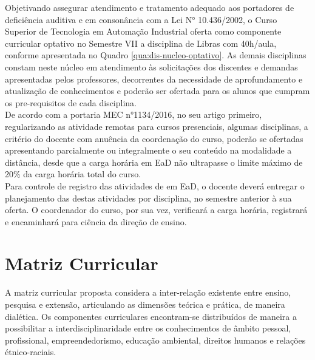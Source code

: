 Objetivando assegurar atendimento e tratamento adequado aos portadores de deficiência auditiva e em consonância com a Lei N° 10.436/2002, o Curso Superior de Tecnologia em Automação Industrial oferta como componente curricular optativo no Semestre VII a disciplina de Libras com 40h/aula, conforme apresentada no Quadro \ref{qua:dis-nucleo-optativo}. As demais disciplinas constam neste núcleo em atendimento às solicitações dos discentes e demandas apresentadas pelos professores, decorrentes da necessidade de aprofundamento e atualização de conhecimentos e poderão ser ofertada para os alunos que cumpram os pre-requisitos de cada disciplina.\\

De acordo com a portaria MEC n°1134/2016, no seu artigo primeiro,  regularizando as atividade remotas para cursos presenciais, algumas disciplinas, a critério do docente com anuência da coordenação do curso, poderão se ofertadas apresentando parcialmente ou integralmente o seu conteúdo na modalidade a distância, desde que a carga horária em EaD não ultrapasse o limite máximo de 20\% da carga horária total do curso.\\

Para controle de registro das atividades de em EaD, o docente deverá entregar o planejamento das destas atividades por disciplina, no semestre anterior à sua oferta. O coordenador do curso, por sua vez, verificará a carga horária, registrará e encaminhará para ciência da direção de ensino.\\

\section{Matriz Curricular}

A matriz curricular proposta considera a inter-relação existente entre ensino, pesquisa e extensão, articulando as dimensões teórica e prática, de maneira dialética. Os componentes curriculares encontram-se distribuídos de maneira a possibilitar a interdisciplinaridade entre os conhecimentos de âmbito pessoal, profissional, empreendedorismo, educação ambiental, direitos humanos e relações étnico-raciais.

